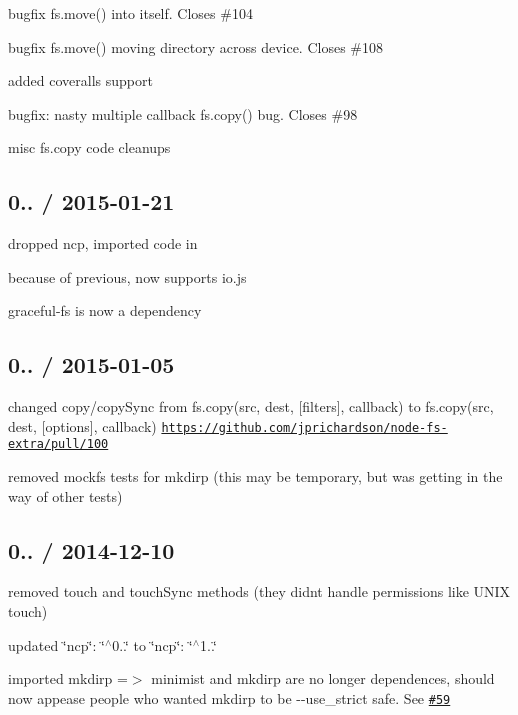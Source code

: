 \begin{DoxyItemize}
\item bugfix {\ttfamily fs.\+move()} into itself. Closes \#104
\item bugfix {\ttfamily fs.\+move()} moving directory across device. Closes \#108
\item added coveralls support
\item bugfix\+: nasty multiple callback {\ttfamily fs.\+copy()} bug. Closes \#98
\item misc fs.\+copy code cleanups
\end{DoxyItemize}

\subsection*{0.. / 2015-\/01-\/21 }


\begin{DoxyItemize}
\item dropped {\ttfamily ncp}, imported code in
\item because of previous, now supports {\ttfamily io.\+js}
\item {\ttfamily graceful-\/fs} is now a dependency
\end{DoxyItemize}

\subsection*{0.. / 2015-\/01-\/05 }


\begin{DoxyItemize}
\item changed {\ttfamily copy}/{\ttfamily copy\+Sync} from {\ttfamily fs.\+copy(src, dest, \mbox{[}filters\mbox{]}, callback)} to {\ttfamily fs.\+copy(src, dest, \mbox{[}options\mbox{]}, callback)} \href{https://github.com/jprichardson/node-fs-extra/pull/100}{\tt https\+://github.\+com/jprichardson/node-\/fs-\/extra/pull/100}
\item removed mockfs tests for mkdirp (this may be temporary, but was getting in the way of other tests)
\end{DoxyItemize}

\subsection*{0.. / 2014-\/12-\/10 }


\begin{DoxyItemize}
\item removed {\ttfamily touch} and {\ttfamily touch\+Sync} methods (they didn\textquotesingle{}t handle permissions like U\+N\+I\+X touch)
\item updated {\ttfamily \char`\"{}ncp\char`\"{}\+: \char`\"{}$^\wedge$0..\char`\"{}} to {\ttfamily \char`\"{}ncp\char`\"{}\+: \char`\"{}$^\wedge$1..\char`\"{}}
\item imported {\ttfamily mkdirp} =$>$ {\ttfamily minimist} and {\ttfamily mkdirp} are no longer dependences, should now appease people who wanted {\ttfamily mkdirp} to be {\ttfamily -\/-\/use\+\_\+strict} safe. See \href{https://github.com/jprichardson/node-fs-extra/issues/59}{\tt \#59}
\end{DoxyItemize}

